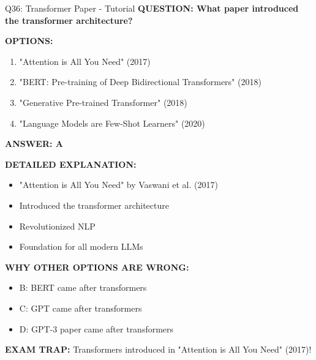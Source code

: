 \documentclass[8pt]{beamer}
\begin{document}
	\begin{frame}{Q36: Transformer Paper - Tutorial}
		\fontsize{6.5}{7.5}\selectfont
		\textbf{QUESTION: What paper introduced the transformer architecture?}
		
		\vspace{0.1cm}
		\textbf{OPTIONS:}
		\begin{enumerate}
			\item "Attention is All You Need" (2017)
			\item "BERT: Pre-training of Deep Bidirectional Transformers" (2018)
			\item "Generative Pre-trained Transformer" (2018)
			\item "Language Models are Few-Shot Learners" (2020)
		\end{enumerate}
		
		\vspace{0.1cm}
		\textcolor{myblue}{\textbf{ANSWER: A}}
		
		\vspace{0.1cm}
		\textbf{DETAILED EXPLANATION:}
		\begin{itemize}
			\item "Attention is All You Need" by Vaswani et al. (2017)
			\item Introduced the transformer architecture
			\item Revolutionized NLP
			\item Foundation for all modern LLMs
		\end{itemize}
		
		\vspace{0.1cm}
		\textcolor{myred}{\textbf{WHY OTHER OPTIONS ARE WRONG:}}
		\begin{itemize}
			\item \textcolor{myred}{B:} BERT came after transformers
			\item \textcolor{myred}{C:} GPT came after transformers
			\item \textcolor{myred}{D:} GPT-3 paper came after transformers
		\end{itemize}
		
		\textcolor{myred}{\textbf{EXAM TRAP:}} Transformers introduced in \textcolor{myblue}{"Attention is All You Need"} (2017)!
	\end{frame}
	
\end{document}
